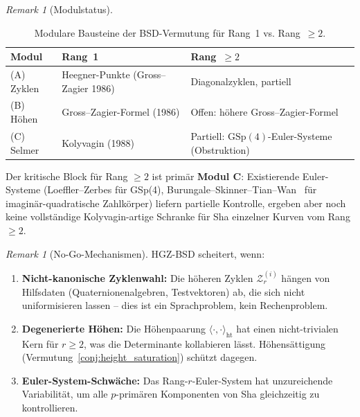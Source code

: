 \documentclass[aps,prd,twocolumn,superscriptaddress,nofootinbib,floatfix]{revtex4-2}
\theoremstyle{definition}
\theoremstyle{remark}
\newtheorem{remark}[theorem]{Remark}
\begin{document}
\begin{remark}[Modulstatus]\label{rem:hgz-modules}
\begin{table}[t]
\centering
\small
\caption{Modulare Bausteine der BSD-Vermutung für Rang~1 vs. Rang~$\geq 2$.}
\label{tab:module_comparison}
\begin{tabular*}{\textwidth}{@{\extracolsep{\fill}}lll@{}}
\toprule
\textbf{Modul} & \textbf{Rang~1} & \textbf{Rang~$\geq 2$} \\
\midrule
(A) Zyklen & Heegner-Punkte (Gross--Zagier 1986) & Diagonalzyklen, partiell \\
\addlinespace
(B) Höhen & Gross--Zagier-Formel (1986) & Offen: höhere Gross--Zagier-Formel \\
\addlinespace
(C) Selmer & Kolyvagin (1988) & Partiell: $\mathrm{GSp}(4)$-Euler-Systeme (Obstruktion) \\
\bottomrule
\end{tabular*}
\end{table}
Der kritische Block für Rang $\geq 2$ ist primär \textbf{Modul C}: Existierende Euler-Systeme (Loeffler--Zerbes für GSp(4), Burungale--Skinner--Tian--Wan~\cite{BSTW2024} für imaginär-quadratische Zahlkörper) liefern partielle Kontrolle, ergeben aber noch keine vollständige Kolyvagin-artige Schranke für Sha einzelner Kurven vom Rang $\geq 2$.
\end{remark}

\begin{remark}[No-Go-Mechanismen]\label{rem:hgz-nogo}
HGZ-BSD scheitert, wenn:
\begin{enumerate}
\item \textbf{Nicht-kanonische Zyklenwahl:} Die höheren Zyklen $\mathcal{Z}_r^{(i)}$ hängen von Hilfsdaten (Quaternionenalgebren, Testvektoren) ab, die sich nicht uniformisieren lassen -- dies ist ein Sprachproblem, kein Rechenproblem.
\item \textbf{Degenerierte Höhen:} Die Höhenpaarung $\langle \cdot, \cdot \rangle_{\mathrm{ht}}$ hat einen nicht-trivialen Kern für $r \geq 2$, was die Determinante kollabieren lässt. Höhensättigung (Vermutung~\ref{conj:height_saturation}) schützt dagegen.
\item \textbf{Euler-System-Schwäche:} Das Rang-$r$-Euler-System hat unzureichende Variabilität, um alle $p$-primären Komponenten von Sha gleichzeitig zu kontrollieren.
\end{enumerate}
\end{remark}
\end{document}
